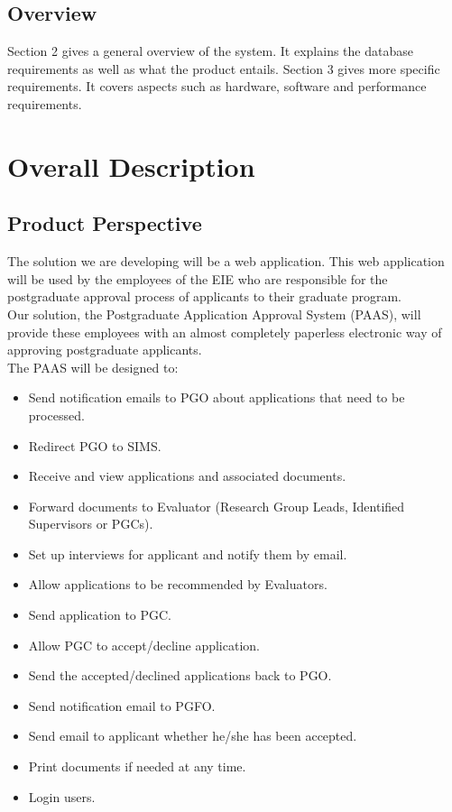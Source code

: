 \documentclass{article}
\begin{document}
\subsection{Overview}
Section 2 gives a general overview of the system. It explains the database requirements as well as what the product entails. Section 3 gives more specific requirements. It covers aspects such as hardware, software and performance requirements.

\section{Overall Description}
\subsection{Product Perspective}
The solution we are developing will be a web application. This web application will be used by the employees of the EIE who are responsible for the postgraduate approval process of applicants to their graduate program. \\
Our solution, the Postgraduate Application Approval System (PAAS), will provide these employees with an almost completely paperless electronic way of approving postgraduate applicants. \\
The PAAS will be designed to:
\begin{itemize}
\item Send notification emails to PGO about applications that need to be processed.
\item Redirect PGO to SIMS.
\item Receive and view applications and associated documents.
\item Forward documents to Evaluator (Research Group Leads, Identified Supervisors or PGCs).
\item Set up interviews for applicant and notify them by email.
\item Allow applications to be recommended by Evaluators.
\item Send application to PGC.
\item Allow PGC to accept/decline application.
\item Send the accepted/declined applications back to PGO.
\item Send notification email to PGFO.
\item Send email to applicant whether he/she has been accepted.
\item Print documents if needed at any time.
\item Login users.
\end{itemize}
\end{document}
